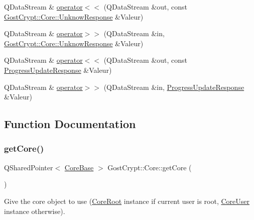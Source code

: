 \begin{DoxyCompactItemize}
\item 
Q\+Data\+Stream \& \hyperlink{namespace_gost_crypt_1_1_core_a0b68987ff3609bef2da3e26cef99bd51}{operator$<$$<$} (Q\+Data\+Stream \&out, const \hyperlink{class_gost_crypt_1_1_core_1_1_unknow_response}{Gost\+Crypt\+::\+Core\+::\+Unknow\+Response} \&Valeur)
\item 
Q\+Data\+Stream \& \hyperlink{namespace_gost_crypt_1_1_core_a6a58cc258d21355d5da1e6e8c6639497}{operator$>$$>$} (Q\+Data\+Stream \&in, \hyperlink{class_gost_crypt_1_1_core_1_1_unknow_response}{Gost\+Crypt\+::\+Core\+::\+Unknow\+Response} \&Valeur)
\item 
Q\+Data\+Stream \& \hyperlink{namespace_gost_crypt_1_1_core_a6f83057428e1e2c35135d9aa77d94e85}{operator$<$$<$} (Q\+Data\+Stream \&out, const \hyperlink{struct_gost_crypt_1_1_core_1_1_progress_update_response}{Progress\+Update\+Response} \&Valeur)
\item 
Q\+Data\+Stream \& \hyperlink{namespace_gost_crypt_1_1_core_a60ed3f1dfef3922d28a85bcd52fb1edd}{operator$>$$>$} (Q\+Data\+Stream \&in, \hyperlink{struct_gost_crypt_1_1_core_1_1_progress_update_response}{Progress\+Update\+Response} \&Valeur)
\end{DoxyCompactItemize}


\subsection{Function Documentation}
\mbox{\label{namespace_gost_crypt_1_1_core_aebee4c3e0812331b85f018855887dfde}} 
\subsubsection{\texorpdfstring{get\+Core()}{getCore()}}
{\footnotesize\ttfamily Q\+Shared\+Pointer$<$ \hyperlink{class_gost_crypt_1_1_core_1_1_core_base}{Core\+Base} $>$ Gost\+Crypt\+::\+Core\+::get\+Core (\begin{DoxyParamCaption}{ }\end{DoxyParamCaption})}



Give the core object to use (\hyperlink{class_gost_crypt_1_1_core_1_1_core_root}{Core\+Root} instance if current user is root, \hyperlink{class_gost_crypt_1_1_core_1_1_core_user}{Core\+User} instance otherwise). 

